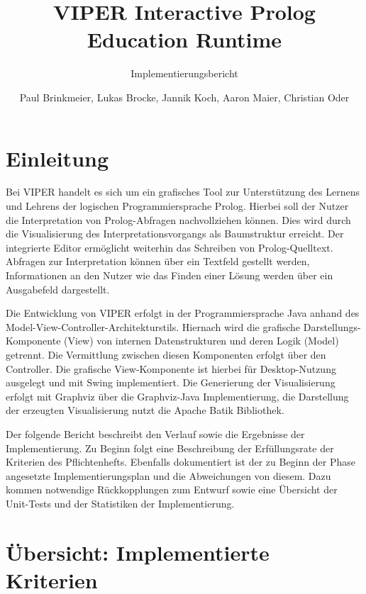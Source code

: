 \documentclass[parskip=full,11pt,twoside]{scrartcl}
\title{VIPER Interactive Prolog Education Runtime}
\subtitle{Implementierungsbericht}
\author{Paul Brinkmeier, Lukas Brocke, Jannik Koch, Aaron Maier, Christian Oder}
\begin{document}
\maketitle
\tableofcontents

\section{Einleitung}
\setcounter{page}{1}

Bei VIPER handelt es sich um ein grafisches Tool zur Unterstützung des Lernens und Lehrens der logischen Programmiersprache Prolog. Hierbei soll der Nutzer die Interpretation von Prolog-Abfragen nachvollziehen können. Dies wird durch die Visualisierung des Interpretationsvorgangs als Baumstruktur erreicht. Der integrierte Editor ermöglicht weiterhin das Schreiben von Prolog-Quelltext. Abfragen zur Interpretation können über ein Textfeld gestellt werden, Informationen an den Nutzer wie das Finden einer Lösung werden über ein Ausgabefeld dargestellt.

Die Entwicklung von VIPER erfolgt in der Programmiersprache Java anhand des Model-View-Controller-Architekturstils. Hiernach wird die grafische Darstellungs-Komponente (View) von internen Datenstrukturen und deren Logik (Model) getrennt. Die Vermittlung zwischen diesen Komponenten erfolgt über den Controller. Die grafische View-Komponente ist hierbei für Desktop-Nutzung ausgelegt und mit Swing implementiert. Die Generierung der Visualisierung erfolgt mit Graphviz über die Graphviz-Java Implementierung, die Darstellung der erzeugten Visualisierung nutzt die Apache Batik Bibliothek.

Der folgende Bericht beschreibt den Verlauf sowie die Ergebnisse der Implementierung. Zu Beginn folgt eine Beschreibung der Erfüllungsrate der Kriterien des Pflichtenhefts. Ebenfalls dokumentiert ist der zu Beginn der Phase angesetzte Implementierungsplan und die Abweichungen von diesem. Dazu kommen notwendige Rückkopplungen zum Entwurf sowie eine Übersicht der Unit-Tests und der Statistiken der Implementierung.

\section{Übersicht: Implementierte Kriterien}
\end{document}
